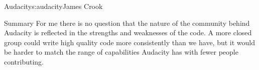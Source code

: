 \begin{aosachapter}{Audacity}{s:audacity}{James Crook}
\begin{aosasect1}{Summary}
For me there is no question that the nature of the community behind
Audacity is reflected in the strengths and weaknesses of the code.  A
more closed group could write high quality code more consistently
than we have, but it would be harder to match the range
of capabilities Audacity has with fewer people contributing.

\end{aosasect1}

\end{aosachapter}
